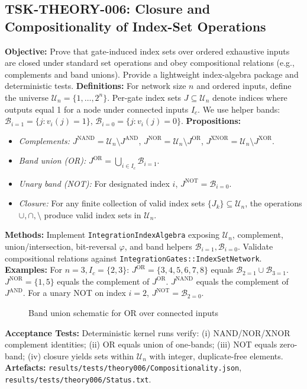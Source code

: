 \documentclass{article}
\begin{document}
\subsection{TSK-THEORY-006: Closure and Compositionality of Index-Set Operations}
\textbf{Objective:} Prove that gate-induced index sets over ordered exhaustive inputs are closed under standard set operations and obey compositional relations (e.g., complements and band unions). Provide a lightweight index-algebra package and deterministic tests.
\textbf{Definitions:} For network size \(n\) and ordered inputs, define the universe \(\mathcal{U}_n=\{1,\dots,2^n\}\). Per-gate index sets \(J\subseteq\mathcal{U}_n\) denote indices where outputs equal 1 for a node under connected inputs \(I_c\). We use helper bands: \(\mathcal{B}_{i=1}=\{ j: v_i(j)=1\}\), \(\mathcal{B}_{i=0}=\{ j: v_i(j)=0\}\).
\textbf{Propositions:}
\begin{itemize}
 \item \emph{Complements:} \(J^{\mathrm{NAND}} = \mathcal{U}_n \setminus J^{\mathrm{AND}}\), \(J^{\mathrm{NOR}} = \mathcal{U}_n \setminus J^{\mathrm{OR}}\), \(J^{\mathrm{XNOR}} = \mathcal{U}_n \setminus J^{\mathrm{XOR}}\).
 \item \emph{Band union (OR):} \(J^{\mathrm{OR}} = \bigcup_{i\in I_c} \mathcal{B}_{i=1}\).
 \item \emph{Unary band (NOT):} For designated index \(i\), \(J^{\mathrm{NOT}} = \mathcal{B}_{i=0}\).
 \item \emph{Closure:} For any finite collection of valid index sets \(\{J_k\}\subseteq\mathcal{U}_n\), the operations \(\cup,\cap,\setminus\) produce valid index sets in \(\mathcal{U}_n\).
\end{itemize}
\textbf{Methods:} Implement \texttt{Integration\textasciigrave IndexAlgebra} exposing \(\mathcal{U}_n\), complement, union/intersection, bit-reversal \(\varphi\), and band helpers \(\mathcal{B}_{i=1}, \mathcal{B}_{i=0}\). Validate compositional relations against \texttt{Integration\textasciigrave Gates::IndexSetNetwork}.
\textbf{Examples:} For \(n=3, I_c=\{2,3\}\): \(J^{\mathrm{OR}}=\{3,4,5,6,7,8\}\) equals \(\mathcal{B}_{2=1}\cup\mathcal{B}_{3=1}\). \(J^{\mathrm{NOR}}=\{1,5\}\) equals the complement of \(J^{\mathrm{OR}}\). \(J^{\mathrm{NAND}}\) equals the complement of \(J^{\mathrm{AND}}\). For a unary NOT on index \(i=2\), \(J^{\mathrm{NOT}}=\mathcal{B}_{2=0}\).
\begin{figure}[h]
\centering
{}
\caption{Band union schematic for OR over connected inputs}
\end{figure}
\textbf{Acceptance Tests:} Deterministic kernel runs verify: (i) NAND/NOR/XNOR complement identities; (ii) OR equals union of one-bands; (iii) NOT equals zero-band; (iv) closure yields sets within \(\mathcal{U}_n\) with integer, duplicate-free elements.
\textbf{Artefacts:} \texttt{results/tests/theory006/Compositionality.json}, \texttt{results/tests/theory006/Status.txt}.
\end{document}
